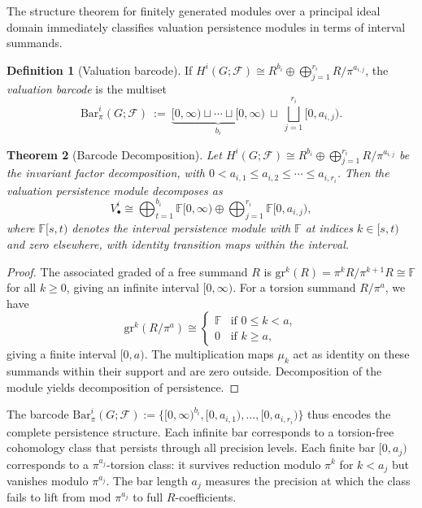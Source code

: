 \documentclass[11pt]{amsart}
\theoremstyle{plain}
\newtheorem{theorem}{Theorem}[section]
\theoremstyle{definition}
\newtheorem{definition}[theorem]{Definition}
\newtheorem{remark}[theorem]{Remark}
\newcommand{\Ring}{R}                          %
\newcommand{\unif}{\pi}                        %
\newcommand{\sheaf}[1]{\mathcal{#1}}                  %
\newcommand{\gr}{\mathrm{gr}}                         %
\begin{document}
The structure theorem for finitely generated modules over a principal ideal domain immediately classifies valuation persistence modules in terms of interval summands.

\begin{definition}[Valuation barcode]
\label{def:valuation-barcode}
If $H^i(G;\sheaf{F})\cong \Ring^{b_i}\oplus\bigoplus_{j=1}^{r_i} \Ring/\unif^{a_{i,j}}$,
the \emph{valuation barcode} is the multiset
\[
\mathrm{Bar}^i_\unif(G;\sheaf{F})\ :=\ \underbrace{[0,\infty)\sqcup\cdots\sqcup[0,\infty)}_{b_i}
\ \sqcup\ \bigsqcup_{j=1}^{r_i} [0,a_{i,j}).
\]
\end{definition}

\begin{theorem}[Barcode Decomposition]
\label{thm:barcode-decomposition}
Let $H^i(G;\sheaf{F}) \cong \Ring^{b_i} \oplus \bigoplus_{j=1}^{r_i} \Ring/\unif^{a_{i,j}}$ be the invariant factor decomposition, with $0 < a_{i,1} \le a_{i,2} \le \cdots \le a_{i,r_i}$. Then the valuation persistence module decomposes as
\[
V^i_\bullet \cong \bigoplus_{t=1}^{b_i} \mathbb{F}[0,\infty) \oplus \bigoplus_{j=1}^{r_i} \mathbb{F}[0, a_{i,j}),
\]
where $\mathbb{F}[s,t)$ denotes the interval persistence module with $\mathbb{F}$ at indices $k \in [s,t)$ and zero elsewhere, with identity transition maps within the interval.
\end{theorem}

\begin{proof}
The associated graded of a free summand $\Ring$ is $\gr^k(\Ring) = \unif^k \Ring/\unif^{k+1}\Ring \cong \mathbb{F}$ for all $k \ge 0$, giving an infinite interval $[0,\infty)$. For a torsion summand $\Ring/\unif^a$, we have
\[
\gr^k(\Ring/\unif^a) \cong \begin{cases}
\mathbb{F} & \text{if } 0 \le k < a, \\
0 & \text{if } k \ge a,
\end{cases}
\]
giving a finite interval $[0,a)$. The multiplication maps $\mu_k$ act as identity on these summands within their support and are zero outside. Decomposition of the module yields decomposition of persistence.
\end{proof}


The barcode $\mathrm{Bar}^i_\unif(G;\sheaf{F}) := \{[0,\infty)^{b_i}, [0,a_{i,1}), \ldots, [0,a_{i,r_i})\}$ thus encodes the complete persistence structure. Each infinite bar corresponds to a torsion-free cohomology class that persists through all precision levels. Each finite bar $[0,a_j)$ corresponds to a $\unif^{a_j}$-torsion class: it survives reduction modulo $\unif^k$ for $k < a_j$ but vanishes modulo $\unif^{a_j}$. The bar length $a_j$ measures the precision at which the class fails to lift from mod $\unif^{a_j}$ to full $\Ring$-coefficients.
\end{document}
